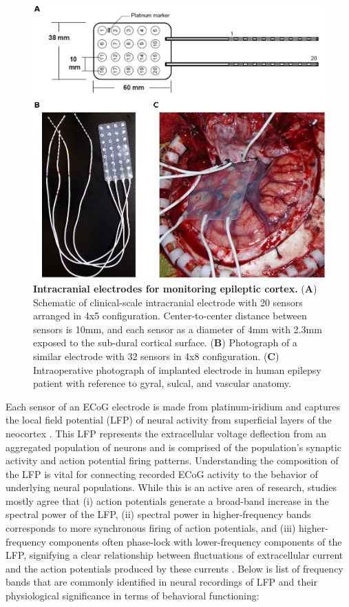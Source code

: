 \begin{figure}
\centering
\includegraphics[width=\textwidth]{intracranial_electrodes}
\caption[Implantation of intracranial electrodes]{\textbf{Intracranial electrodes for monitoring epileptic cortex.} (\textbf{A}) Schematic of clinical-scale intracranial electrode with 20 sensors arranged in 4x5 configuration. Center-to-center distance between sensors is 10mm, and each sensor as a diameter of 4mm with 2.3mm exposed to the sub-dural cortical surface. (\textbf{B}) Photograph of a similar electrode with 32 sensors in 4x8 configuration. (\textbf{C}) Intraoperative photograph of implanted electrode in human epilepsy patient with reference to gyral, sulcal, and vascular anatomy.}
\label{intracranial_electrodes}
\end{figure}

Each sensor of an ECoG electrode is made from platinum-iridium and captures the local field potential (LFP) of neural activity from superficial layers of the neocortex \cite{buzsaki2012origin}. This LFP represents the extracellular voltage deflection from an aggregated population of neurons and is comprised of the population's synaptic activity and action potential firing patterns. Understanding the composition of the LFP is vital for connecting recorded ECoG activity to the behavior of underlying neural populations. While this is an active area of research, studies mostly agree that (i) action potentials generate a broad-band increase in the spectral power of the LFP, (ii) spectral power in higher-frequency bands corresponds to more synchronous firing of action potentials, and (iii) higher-frequency components often phase-lock with lower-frequency components of the LFP, signifying a clear relationship between fluctuations of extracellular current and the action potentials produced by these currents \cite{buzsaki2012origin}. Below is list of frequency bands that are commonly identified in neural recordings of LFP and their physiological significance in terms of behavioral functioning:

